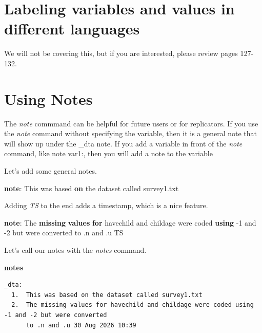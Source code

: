 \documentclass[
]{book}
\newenvironment{Shaded}{\begin{snugshade}}{\end{snugshade}}
\newcommand{\FunctionTok}[1]{\textcolor[rgb]{0.13,0.29,0.53}{\textbf{#1}}}
\newcommand{\KeywordTok}[1]{\textcolor[rgb]{0.13,0.29,0.53}{\textbf{#1}}}
\newcommand{\NormalTok}[1]{#1}
\begin{document}
\section{Labeling variables and values in different languages}\label{labeling-variables-and-values-in-different-languages}

We will not be covering this, but if you are interested, please review pages 127-132.

\section{Using Notes}\label{using-notes}

The \emph{note} commmand can be helpful for future users or for replicators. If you use the \emph{note} command without specifying the variable, then it is a general note that will show up under the \_dta note. If you add a variable in front of the \emph{note} command, like note var1:, then you will add a note to the variable

Let's add some general notes.

\begin{Shaded}
\begin{Highlighting}[]
\KeywordTok{note}\NormalTok{: This was based }\KeywordTok{on}\NormalTok{ the dataset called survey1.txt}
\end{Highlighting}
\end{Shaded}

Adding \emph{TS} to the end adds a timestamp, which is a nice feature.

\begin{Shaded}
\begin{Highlighting}[]
\KeywordTok{note}\NormalTok{: The }\FunctionTok{missing} \KeywordTok{values} \KeywordTok{for}\NormalTok{ havechild and childage were coded }\KeywordTok{using}\NormalTok{ {-}1 and {-}2 but were converted to .n and .u TS}
\end{Highlighting}
\end{Shaded}

Let's call our notes with the \emph{notes} command.

\begin{Shaded}
\begin{Highlighting}[]
\KeywordTok{notes}
\end{Highlighting}
\end{Shaded}

\begin{verbatim}
_dta:
  1.  This was based on the dataset called survey1.txt
  2.  The missing values for havechild and childage were coded using -1 and -2 but were converted
      to .n and .u 30 Aug 2026 10:39
\end{verbatim}
\end{document}
